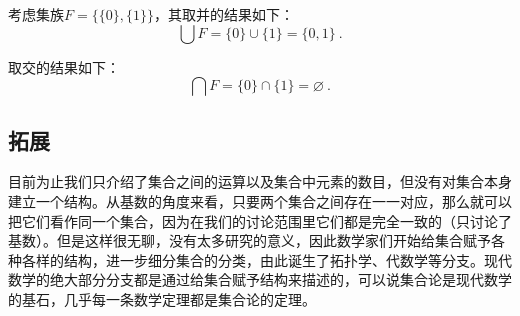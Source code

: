\begin{example}{}
考虑集族$F=\{\{0\}, \{1\}\}$，其取并的结果如下：
\begin{equation}
\bigcup F=\{0\}\cup\{1\}=\{0, 1\}~.
\end{equation}

取交的结果如下：
\begin{equation}
\bigcap F=\{0\}\cap\{1\}=\varnothing~.
\end{equation}
\end{example}



\subsection{拓展}
目前为止我们只介绍了集合之间的运算以及集合中元素的数目，但没有对集合本身建立一个结构。从基数的角度来看，只要两个集合之间存在一一对应，那么就可以把它们看作同一个集合，因为在我们的讨论范围里它们都是完全一致的（只讨论了基数）。但是这样很无聊，没有太多研究的意义，因此数学家们开始给集合赋予各种各样的结构，进一步细分集合的分类，由此诞生了拓扑学、代数学等分支。现代数学的绝大部分分支都是通过给集合赋予结构来描述的，可以说集合论是现代数学的基石，几乎每一条数学定理都是集合论的定理。
